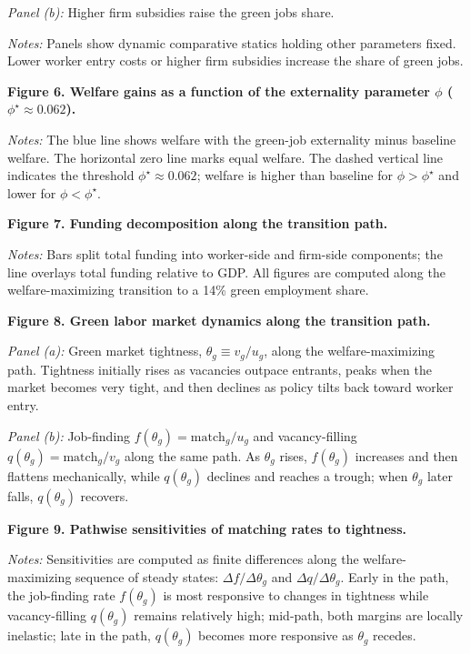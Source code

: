 \documentclass[12pt]{article}
\begin{document}
\noindent\textit{Panel (b):} Higher firm subsidies raise the green jobs share.  

\noindent\textit{Notes:} Panels show dynamic comparative statics holding other parameters fixed. Lower worker entry costs or higher firm subsidies increase the share of green jobs.

\bigskip

\noindent\textbf{Figure 6. Welfare gains as a function of the externality parameter $\phi$ ($\phi^\star \approx 0.062$).}

\noindent\textit{Notes:} The blue line shows welfare with the green-job externality minus baseline welfare. The horizontal zero line marks equal welfare. The dashed vertical line indicates the threshold $\phi^\star \approx 0.062$; welfare is higher than baseline for $\phi > \phi^\star$ and lower for $\phi < \phi^\star$.

\bigskip

\noindent\textbf{Figure 7. Funding decomposition along the transition path.}

\noindent\textit{Notes:} Bars split total funding into worker-side and firm-side components; the line overlays total funding relative to GDP. All figures are computed along the welfare-maximizing transition to a 14\% green employment share.

\bigskip

\noindent\textbf{Figure 8. Green labor market dynamics along the transition path.}

\noindent\textit{Panel (a):} Green market tightness, $\theta_g \equiv v_g/u_g$, along the welfare-maximizing path. Tightness initially rises as vacancies outpace entrants, peaks when the market becomes very tight, and then declines as policy tilts back toward worker entry.  

\noindent\textit{Panel (b):} Job-finding $f(\theta_g) = \text{match}_g/u_g$ and vacancy-filling $q(\theta_g) = \text{match}_g/v_g$ along the same path. As $\theta_g$ rises, $f(\theta_g)$ increases and then flattens mechanically, while $q(\theta_g)$ declines and reaches a trough; when $\theta_g$ later falls, $q(\theta_g)$ recovers.

\bigskip

\noindent\textbf{Figure 9. Pathwise sensitivities of matching rates to tightness.}

\noindent\textit{Notes:} Sensitivities are computed as finite differences along the welfare-maximizing sequence of steady states: $\Delta f/\Delta\theta_g$ and $\Delta q/\Delta\theta_g$. Early in the path, the job-finding rate $f(\theta_g)$ is most responsive to changes in tightness while vacancy-filling $q(\theta_g)$ remains relatively high; mid-path, both margins are locally inelastic; late in the path, $q(\theta_g)$ becomes more responsive as $\theta_g$ recedes.
\end{document}
